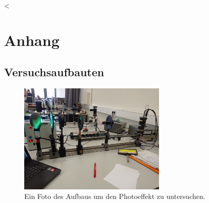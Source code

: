 <\newpage
\section{Anhang}

\subsection{Versuchsaufbauten}
\begin{figure}[H]
    \centering
    \includegraphics[width=0.63\textwidth]{latex/images/Aufbau_Photoeffekt.jpeg}
    \caption{Ein Foto des Aufbaus um den Photoeffekt zu untersuchen.}
    \label{img:aufbau}
\end{figure}

